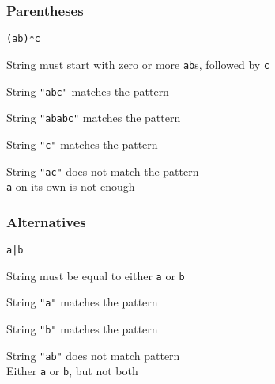 \begin{frame}
  \frametitle{Parentheses}
  \begin{center}
    \texttt{(ab)*c}
  \end{center}
  \begin{center}
    String must start with zero or more \texttt{ab}s, followed by \texttt{c}
  \end{center}
  \begin{overprint}
    \begin{center}
      String \texttt{"abc"} matches the pattern \\[2mm]
    \end{center}

    \begin{center}
      String \texttt{"ababc"} matches the pattern \\[2mm]
    \end{center}

    \begin{center}
      String \texttt{"c"} matches the pattern \\[2mm]
    \end{center}

    \begin{center}
      String \texttt{"ac"} does not match the pattern \\[2mm]
      \texttt{a} on its own is not enough
    \end{center}
  \end{overprint}
\end{frame}

\begin{frame}
  \frametitle{Alternatives}
  \begin{center}
    \texttt{a|b}
  \end{center}
  \begin{center}
    String must be equal to either \texttt{a} or \texttt{b}
  \end{center}
  \begin{overprint}
    \begin{center}
      String \texttt{"a"} matches the pattern \\[2mm]
    \end{center}

    \begin{center}
      String \texttt{"b"} matches the pattern \\[2mm]
    \end{center}

    \begin{center}
      String \texttt{"ab"} does not match pattern \\[2mm]
      Either \texttt{a} or \texttt{b}, but not both
    \end{center}
  \end{overprint}
\end{frame}

